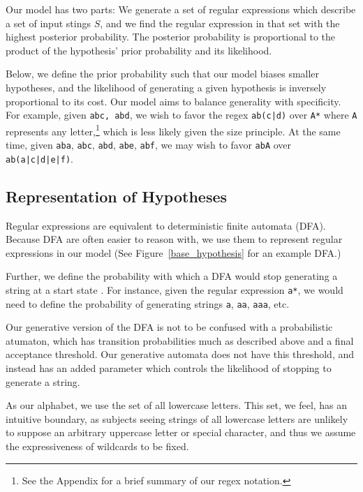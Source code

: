 \documentclass[10pt,letterpaper]{article}
\begin{document}
Our model has two parts: We generate a set of regular expressions which describe a set of input stings $S$, and we find the regular expression in that set with the highest posterior probability. The posterior probability is proportional to the product of the hypothesis' prior probability and its likelihood.

Below, we define the prior probability such that our model biases smaller hypotheses, and the likelihood of generating a given hypothesis is inversely proportional to its cost. Our model aims to balance generality with specificity. For example, given \verb!abc, abd!, we wish to favor the regex \verb!ab(c|d)! over \verb!A*! where \verb!A! represents any letter,\footnote{See the Appendix for a brief summary of our regex notation.} which is less likely given the size principle. At the same time, given \verb!aba!, \verb!abc!, \verb!abd!, \verb!abe!, \verb!abf!, we may wish to favor \verb!abA! over \verb!ab(a|c|d|e|f)!.

\subsection{Representation of Hypotheses}

Regular expressions are equivalent to deterministic finite automata (DFA). Because DFA are often easier to reason with, we use them to represent regular expressions in our model (See Figure~\ref{base_hypothesis} for an example DFA.)

Further, we define the probability with which a DFA would stop generating a string at a start state . For instance, given the regular expression \verb!a*!, we would need to define the probability of generating strings \verb!a!, \verb!aa!, \verb!aaa!, etc.

Our generative version of the DFA is not to be confused with a probabilistic atumaton, which has transition probabilities much as described above and a final acceptance threshold. Our generative automata does not have this threshold, and instead has an added parameter which controls the likelihood of stopping to generate a string.

As our alphabet, we use the set of all lowercase letters. This set, we feel, has an intuitive boundary, as subjects seeing strings of all lowercase letters are unlikely to suppose an arbitrary uppercase letter or special character, and thus we assume the expressiveness of wildcards to be fixed.

\end{document}
